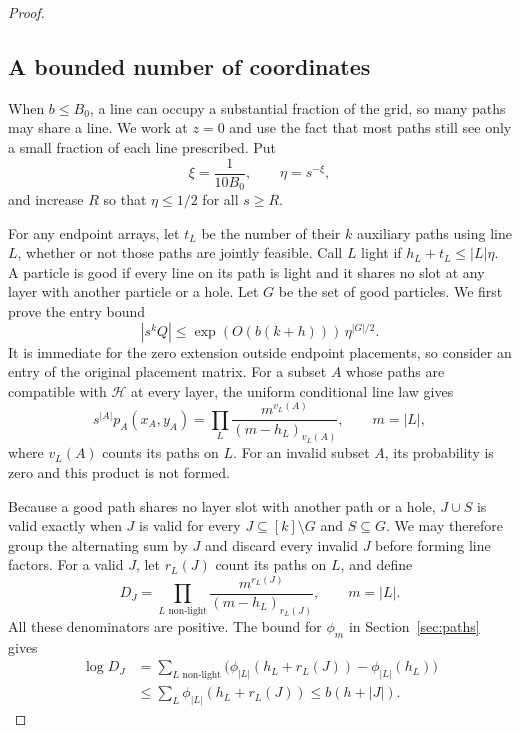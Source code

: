 \begin{proof}
\subsection{A bounded number of coordinates}
\label{ac:part:85}
When \(b\le B_0\), a line can occupy a substantial fraction of the grid, so
many paths may share a line. We work at \(z=0\) and use the fact that most
paths still see only a small fraction of each line prescribed. Put
\[
 \xi=\frac1{10B_0},\qquad \eta=s^{-\xi},
\]
and increase \(R\) so that \(\eta\le1/2\) for all \(s\ge R\).

For any endpoint arrays, let \(t_L\) be the number of their \(k\) auxiliary
paths using line \(L\), whether or not those paths are jointly feasible. Call
\(L\) light if \(h_L+t_L\le |L|\eta\). A particle is good if every line on its
path is light and it shares no slot at any layer with another particle or a
hole. Let \(G\) be the set of good particles. We first prove the entry bound
\begin{equation}
 |s^kQ|\le \exp(O(b(k+h)))\,\eta^{|G|/2}.
 \label{ac:eq:10}
\end{equation}
It is immediate for the zero extension outside endpoint placements, so
consider an entry of the original placement matrix. For a subset \(A\) whose
paths are compatible with \(\mathcal H\) at every layer, the uniform
conditional line law gives
\[
 s^{|A|}p_A(x_A,y_A)
 =\prod_L\frac{m^{v_L(A)}}{(m-h_L)_{v_L(A)}},
 \qquad m=|L|,
\]
where \(v_L(A)\) counts its paths on \(L\). For an invalid subset \(A\), its
probability is zero and this product is not formed.

Because a good path shares no layer slot with another path or a hole,
\(J\cup S\) is valid exactly when \(J\) is valid for every
\(J\subseteq[k]\setminus G\) and \(S\subseteq G\). We may therefore group the
alternating sum by \(J\) and discard every invalid \(J\) before forming line
factors. For a valid \(J\), let \(r_L(J)\) count its paths on \(L\), and
define
\[
 D_J=\prod_{L\text{ non-light}}
       \frac{m^{r_L(J)}}{(m-h_L)_{r_L(J)}},\qquad m=|L|.
\]
All these denominators are positive. The bound for \(\phi_m\) in
Section~\ref{sec:paths} gives
\[
\begin{aligned}
 \log D_J
 &=\sum_{L\text{ non-light}}
    \bigl(\phi_{|L|}(h_L+r_L(J))-\phi_{|L|}(h_L)\bigr)
 \\
 &\le\sum_L\phi_{|L|}(h_L+r_L(J))
 \le b(h+|J|).
\end{aligned}
\]


\end{proof}
